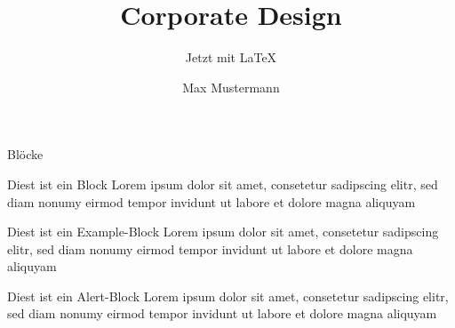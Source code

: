 \documentclass{beamer}
\begin{document}
\title{Corporate Design}
\subtitle{Jetzt mit \LaTeX}
\author{Max Mustermann}

\begin{frame}{Blöcke}
    \begin{block}{Diest ist ein Block}
    Lorem ipsum dolor sit amet, consetetur sadipscing elitr, sed diam
    nonumy eirmod tempor invidunt ut labore et dolore magna aliquyam
  \end{block}
  \begin{exampleblock}{Diest ist ein Example-Block}
    Lorem ipsum dolor sit amet, consetetur sadipscing elitr, sed diam
    nonumy eirmod tempor invidunt ut labore et dolore magna aliquyam
  \end{exampleblock}
  \begin{alertblock}{Diest ist ein Alert-Block}
    Lorem ipsum dolor sit amet, consetetur sadipscing elitr, sed diam
    nonumy eirmod tempor invidunt ut labore et dolore magna aliquyam
  \end{alertblock}
\end{frame}

\end{document}
